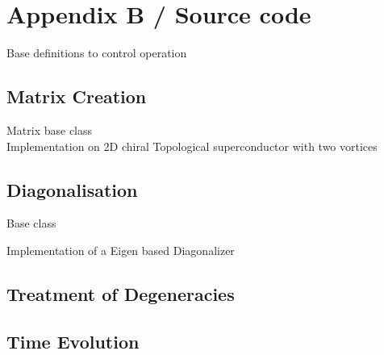 \documentclass[Master]{subfiles}
\begin{document}
\section{Appendix B / Source code}
Base definitions to control operation\\

\subsection{Matrix Creation}
Matrix base class\\

Implementation on 2D chiral Topological superconductor with two vortices

\subsection{Diagonalisation}
Base class

Implementation of a Eigen based Diagonalizer

\subsection{Treatment of Degeneracies}

\subsection{Time Evolution}

\end{document}
